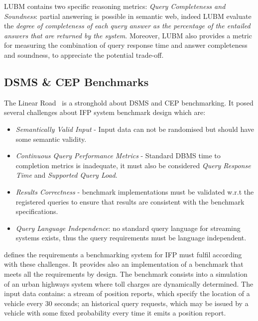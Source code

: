 LUBM contains two specific reasoning metrics: \textit{Query Completeness and Soundness}: partial answering is possible in semantic web, indeed LUBM evaluate the \textit{degree of completeness of each query answer as the percentage of the entailed answers that are returned by the system}. Moreover, LUBM also provides a metric for measuring the combination of  query response time and answer completeness and soundness, to  appreciate the potential trade-off.

\subsection{DSMS \& CEP Benchmarks}\label{sec:linear-road}

The Linear Road~\cite{arasu2004linear} is a stronghold about DSMS and CEP benchmarking. It posed several challenges about IFP system benchmark design which are:
\begin{itemize}
\item  \textit{Semantically Valid Input} -  Input data can not be randomised but should have some semantic validity.
\item  \textit{Continuous Query Performance Metrics} - Standard DBMS time to completion metrics is inadequate, it must also be considered \textit{Query Response Time} and \textit{Supported Query Load}. 
\item  \textit{Results Correctness} - benchmark implementations must be validated w.r.t the registered queries to ensure that results are consistent with the benchmark specifications.
\item  \textit{Query Language Independence}: no standard query language for streaming systems exists, thus the query requirements must be language independent.
\end{itemize}
%
\cite{arasu2004linear} defines the requirements a benchmarking system for IFP must fulfil according with these challenges. It provides also an implementation of a benchmark that meets all the requirements by design. The benchmark consists into a simulation of an urban highways system where toll charges are dynamically determined. The input data contains: a stream of position reports, which specify the location of a vehicle every 30 seconds; an historical query requests, which may be issued by a vehicle with some fixed probability every time it emits a position report.

